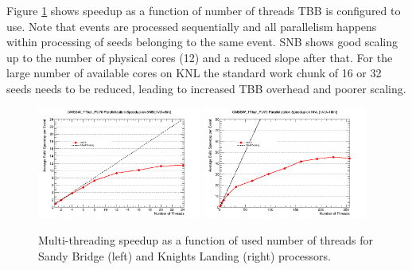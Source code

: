 \documentclass{webofc}
\def\twop{0.48\textwidth}
\def\postfigskip{\vskip-4mm}
\begin{document}
Figure \ref{fig:th-speedup} shows speedup as a function of number of threads
TBB is configured to use. Note that events are processed sequentially and all
parallelism happens within processing of seeds belonging to the same
event. SNB shows good scaling up to the number of physical cores (12) and a
reduced slope after that. For the large number of available cores on KNL the
standard work chunk of 16 or 32 seeds needs to be reduced, leading to
increased TBB overhead and poorer scaling.

\begin{figure}[htb]
  \centering
  \includegraphics[width=\twop]{figs/comp/SNB_CMSSW_TTbar_PU70_TH_speedup.png}
  \hfill
  \includegraphics[width=\twop]{figs/comp/KNL_CMSSW_TTbar_PU70_TH_speedup.png}
  \postfigskip

  \caption{Multi-threading speedup as a function of used number of threads for Sandy
    Bridge (left) and Knights Landing (right) processors.}
  \label{fig:th-speedup}
\end{figure}
\end{document}
